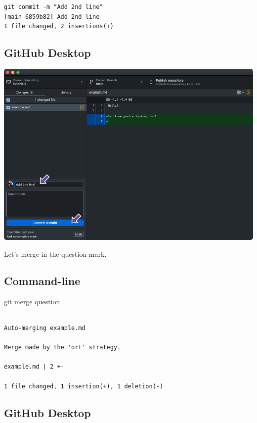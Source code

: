 \documentclass[
  letterpaper,
  DIV=11,
  numbers=noendperiod]{scrartcl}
\newenvironment{Shaded}{\begin{snugshade}}{\end{snugshade}}
\newcommand{\FunctionTok}[1]{\textcolor[rgb]{0.28,0.35,0.67}{#1}}
\newcommand{\NormalTok}[1]{\textcolor[rgb]{0.00,0.23,0.31}{#1}}
\begin{document}
\begin{verbatim}
git commit -m "Add 2nd line"
[main 6859b82] Add 2nd line
1 file changed, 2 insertions(+)
\end{verbatim}

\subsection{GitHub Desktop}

\includegraphics{images/image42.png}

Let's merge in the question mark.

\subsection{Command-line}

\begin{Shaded}
\begin{Highlighting}[]
\FunctionTok{git}\NormalTok{ merge question}
\end{Highlighting}
\end{Shaded}

\begin{verbatim}

Auto-merging example.md

Merge made by the 'ort' strategy.

example.md | 2 +-

1 file changed, 1 insertion(+), 1 deletion(-)
\end{verbatim}

\subsection{GitHub Desktop}
\end{document}

